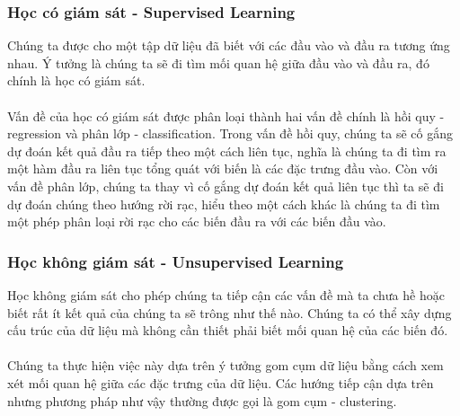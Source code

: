 \subsubsection{Học có giám sát - Supervised Learning}
Chúng ta được cho một tập dữ liệu đã biết với các đầu vào và đầu ra tương ứng
nhau. Ý tưởng là chúng ta sẽ đi tìm mối quan hệ giữa đầu vào và đầu ra, đó 
chính là học có giám sát.\\\\
Vấn đề của học có giám sát được phân loại thành hai
vấn đề chính là hồi quy - regression và phân lớp - classification. Trong vấn đề 
hồi quy, chúng ta sẽ cố gắng dự đoán kết quả đầu ra tiếp theo một cách liên tục, 
nghĩa là chúng ta đi tìm ra một hàm đầu ra liên tục tổng quát với biến là các 
đặc trưng đầu vào. Còn với vấn đề phân lớp, chúng ta thay vì cố gắng dự đoán kết
quả liên tục thì ta sẽ đi dự đoán chúng theo hướng rời rạc, hiểu theo một cách
khác là chúng ta đi tìm một phép phân loại rời rạc cho các biến đầu ra với các 
biến đầu vào.
\subsubsection{Học không giám sát - Unsupervised Learning}
Học không giám sát cho phép chúng ta tiếp cận các vấn đề mà ta chưa hề hoặc biết
rất ít kết quả của chúng ta sẽ trông như thế nào. Chúng ta có thể xây dựng cấu
trúc của dữ liệu mà không cần thiết phải biết mối quan hệ của các biến đó.\\\\
Chúng ta thực hiện việc này dựa trên ý tưởng gom cụm dữ liệu bằng cách xem xét
mối quan hệ giữa các đặc trưng của dữ liệu. Các hướng tiếp cận dựa trên nhưng 
phương pháp như vậy thường được gọi là gom cụm - clustering.
